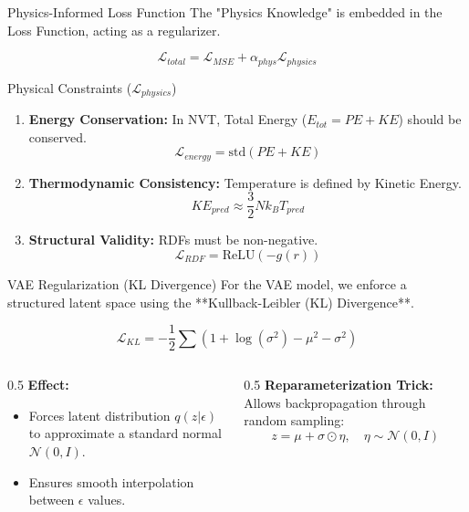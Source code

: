 \documentclass[aspectratio=169, 10pt]{beamer}
\begin{document}
\begin{frame}{Physics-Informed Loss Function}
    The "Physics Knowledge" is embedded in the Loss Function, acting as a regularizer.
    
    $$ \mathcal{L}_{total} = \mathcal{L}_{MSE} + \alpha_{phys}\mathcal{L}_{physics} $$

    \begin{block}{Physical Constraints ($\mathcal{L}_{physics}$)}
        \begin{enumerate}
            \item \textbf{Energy Conservation:} In NVT, Total Energy ($E_{tot} = PE + KE$) should be conserved.
            $$ \mathcal{L}_{energy} = \text{std}(PE + KE) $$
            \item \textbf{Thermodynamic Consistency:} Temperature is defined by Kinetic Energy.
            $$ KE_{pred} \approx \frac{3}{2} N k_B T_{pred} $$
            \item \textbf{Structural Validity:} RDFs must be non-negative.
            $$ \mathcal{L}_{RDF} = \text{ReLU}(-g(r)) $$
        \end{enumerate}
    \end{block}
\end{frame}

\begin{frame}{VAE Regularization (KL Divergence)}
\footnotesize
    For the VAE model, we enforce a structured latent space using the **Kullback-Leibler (KL) Divergence**.

    $$ \mathcal{L}_{KL} = -\frac{1}{2} \sum \left(1 + \log(\sigma^2) - \mu^2 - \sigma^2\right) $$

    \begin{columns}[T]
        \begin{column}{0.5\textwidth}
            \textbf{Effect:}
            \begin{itemize}
                \item Forces latent distribution $q(z|\epsilon)$ to approximate a standard normal $\mathcal{N}(0,I)$.
                \item Ensures smooth interpolation between $\epsilon$ values.
            \end{itemize}
        \end{column}
        \begin{column}{0.5\textwidth}
            \textbf{Reparameterization Trick:}
            Allows backpropagation through random sampling:
            $$ z = \mu + \sigma \odot \eta, \quad \eta \sim \mathcal{N}(0,I) $$
        \end{column}
    \end{columns}
\end{frame}
\end{document}

